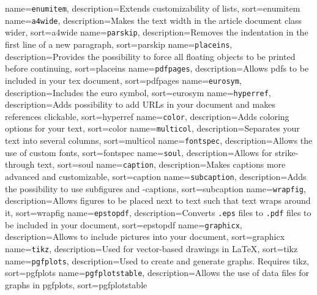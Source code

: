 \makeglossaries
{}
{
	name={\tt enumitem},
	description={Extends customizability of lists},
	sort=enumitem
}
{
	name={\tt a4wide},
	description={Makes the text width in the article document class wider},
	sort=a4wide
}
{
	name={\tt parskip},
	description={Removes the indentation in the first line of a new paragraph},
	sort=parskip
}
{
	name={\tt placeins},
	description={Provides the possibility to force all floating objects to be printed before continuing},
	sort=placeins
}
{
	name={\tt pdfpages},
	description={Allows pdfs to be included in your tex document},
	sort=pdfpages
}
{
	name={\tt eurosym},
	description={Includes the euro symbol},
	sort=eurosym
}
{
	name={\tt hyperref},
	description={Adds possibility to add URLs in your document and makes references clickable},
	sort=hyperref
}
{
	name={\tt color},
	description={Adds coloring options for your text},
	sort=color
}
{
	name={\tt multicol},
	description={Separates your text into several columns},
	sort=multicol
}
{
	name={\tt fontspec},
	description={Allows the use of custom fonts},
	sort=fontspec
}
{
	name={\tt soul},
	description={Allows for strike-through text},
	sort=soul
}
{
	name={\tt caption},
	description={Makes captions more advanced and customizable},
	sort=caption
}
{
	name={\tt subcaption},
	description={Adds the possibility to use subfigures and -captions},
	sort=subcaption
}
{
	name={\tt wrapfig},
	description={Allows figures to be placed next to text such that text wraps around it},
	sort=wrapfig
}
{
	name={\tt epstopdf},
	description={Converts {\tt .eps} files to {\tt .pdf} files to be included in your document},
	sort=epstopdf
}
{
	name={\tt graphicx},
	description={Allows to include pictures into your document},
	sort=graphicx
}
{
	name={\tt tikz},
	description={Used for vector-based drawings in \LaTeX},
	sort=tikz
}
{
	name={\tt pgfplots},
	description={Used to create and generate graphs. Requires \gls{tikz}},
	sort=pgfplots
}
{
	name={\tt pgfplotstable},
	description={Allows the use of data files for graphs in {\gls{pgfplots}}},
	sort=pgfplotstable
}
